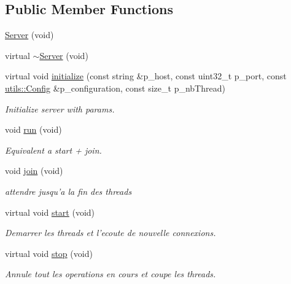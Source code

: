 \subsection*{Public Member Functions}
\begin{DoxyCompactItemize}
\item 
\hyperlink{classxtd_1_1network_1_1base_1_1Server_a3f29ba7011873a7048d944087279fd21}{Server} (void)
\item 
virtual \hyperlink{classxtd_1_1network_1_1base_1_1Server_ab17ca2e2332664f4cb83e89d027976d9}{$\sim$\-Server} (void)
\item 
virtual void \hyperlink{classxtd_1_1network_1_1base_1_1Server_a97d54b5ded7a8b02333347a5ffbbd347}{initialize} (const string \&p\-\_\-host, const uint32\-\_\-t p\-\_\-port, const \hyperlink{classxtd_1_1network_1_1utils_1_1Config}{utils\-::\-Config} \&p\-\_\-configuration, const size\-\_\-t p\-\_\-nb\-Thread)
\begin{DoxyCompactList}\small\item\em Initialize server with params. \end{DoxyCompactList}\item 
void \hyperlink{classxtd_1_1network_1_1base_1_1Server_a30e423831ba183c16425422f07f207c5}{run} (void)
\begin{DoxyCompactList}\small\item\em Equivalent a start + join. \end{DoxyCompactList}\item 
void \hyperlink{classxtd_1_1network_1_1base_1_1Server_aabee855541e60adeb2115856d123637b}{join} (void)
\begin{DoxyCompactList}\small\item\em attendre jusqu'a la fin des threads \end{DoxyCompactList}\item 
virtual void \hyperlink{classxtd_1_1network_1_1base_1_1Server_ae9d5a1070819996c244003adc92a35ee}{start} (void)
\begin{DoxyCompactList}\small\item\em Demarrer les threads et l'ecoute de nouvelle connexions. \end{DoxyCompactList}\item 
virtual void \hyperlink{classxtd_1_1network_1_1base_1_1Server_a0746f85458e7eff28cfe6e156ad99402}{stop} (void)
\begin{DoxyCompactList}\small\item\em Annule tout les operations en cours et coupe les threads. \end{DoxyCompactList}\end{DoxyCompactItemize}
